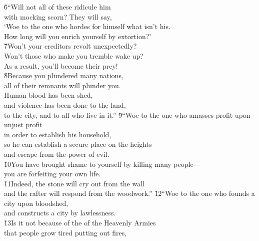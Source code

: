 \begin{poetry}
\poeml \v{6}``Will not all of these ridicule him \\
\poemll    with mocking scorn? They will say, \\
\poeml `Woe to the one who hordes for himself what isn't his. \\
\poemll    How long will you enrich yourself by extortion?' \\
\poeml \v{7}Won't your creditors revolt unexpectedly? \\
\poemll    Won't those who make you tremble wake up? \\
\poemlll       As a result, you'll become their prey! \\
\poeml \v{8}Because you plundered many nations, \\
\poemll    all of their remnants will plunder you. \\
\poeml Human blood has been shed, \\
\poemll    and violence has been done to the land, \\
\poemlll       to the city, and to all who live in it.''
\poeml \v{9}``Woe to the one who amasses profit upon unjust profit \\
\poemll    in order to establish his household, \\
\poeml so he can establish a secure place on the heights \\
\poemll    and escape from the power of evil. \\
\poeml \v{10}You have brought shame to yourself by killing many people--- \\
\poemll    you are forfeiting your own life. \\
\poeml \v{11}Indeed, the stone will cry out from the wall \\
\poemll    and the rafter will respond from the woodwork.''
\poeml \v{12}``Woe to the one who founds a city upon bloodshed, \\
\poemll    and constructs a city by lawlessness. \\
\poeml \v{13}Is it not because of the  of the Heavenly Armies \\
\poemll    that people grow tired putting out fires, \\

\end{poetry}
